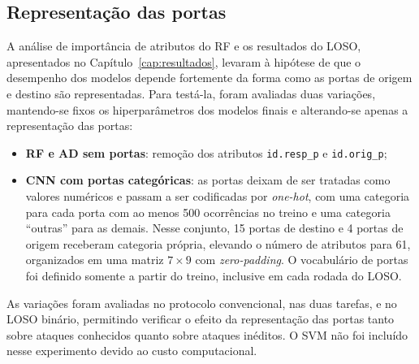 \subsection{Representação das portas}
\label{sec:exp-portas}

A análise de importância de atributos do RF e os resultados do LOSO, apresentados no Capítulo~\ref{cap:resultados}, levaram à hipótese de que o desempenho dos modelos depende fortemente da forma como as portas de origem e destino são representadas. Para testá-la, foram avaliadas duas variações, mantendo-se fixos os hiperparâmetros dos modelos finais e alterando-se apenas a representação das portas:
\begin{itemize}
    \item \textbf{RF e AD sem portas}: remoção dos atributos \texttt{id.resp\_p} e \texttt{id.orig\_p};
    \item \textbf{CNN com portas categóricas}: as portas deixam de ser tratadas como valores numéricos e passam a ser codificadas por \textit{one-hot}, com uma categoria para cada porta com ao menos 500 ocorrências no treino e uma categoria ``outras'' para as demais. Nesse conjunto, 15 portas de destino e 4 portas de origem receberam categoria própria, elevando o número de atributos para 61, organizados em uma matriz $7 \times 9$ com \textit{zero-padding}. O vocabulário de portas foi definido somente a partir do treino, inclusive em cada rodada do LOSO.
\end{itemize}

As variações foram avaliadas no protocolo convencional, nas duas tarefas, e no LOSO binário, permitindo verificar o efeito da representação das portas tanto sobre ataques conhecidos quanto sobre ataques inéditos. O SVM não foi incluído nesse experimento devido ao custo computacional.
